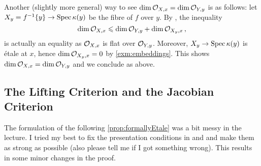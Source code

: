 \begin{rem*}
	Another (slightly more general) way to see $\dim \mathcal{O}_{X,x}=\dim\mathcal{O}_{Y,y}$ is as follows: let $X_y=f^{-1}\{y\}\morphism\Spec \kappa(y)$ be the fibre of $f$ over $y$. By \cite[]{stacks-project}, the inequality
	\begin{equation*}
		\dim\mathcal{O}_{X,x}\leqslant\dim\mathcal{O}_{Y,y}+\dim\mathcal{O}_{X_y,x}\,,
	\end{equation*}
	is actually an equality as $\mathcal{O}_{X,x}$ is flat over $\mathcal{O}_{Y,y}$. Moreover, $X_y\morphism \Spec \kappa(y)$ is étale at $x$, hence $\dim \mathcal{O}_{X_y,x}=0$ by \cref{exm:embeddings}. This shows $\dim \mathcal{O}_{X,x}=\dim\mathcal{O}_{Y,y}$ and we conclude as above.
\end{rem*}
\subsection{The Lifting Criterion and the Jacobian Criterion}
The formulation of the following \cref{prop:formallyEtale} was a bit messy in the lecture. I tried my best to fix the presentation conditions in  and  and make them as strong as possible (also please tell me if I got something wrong). This results in some minor changes in the proof.
